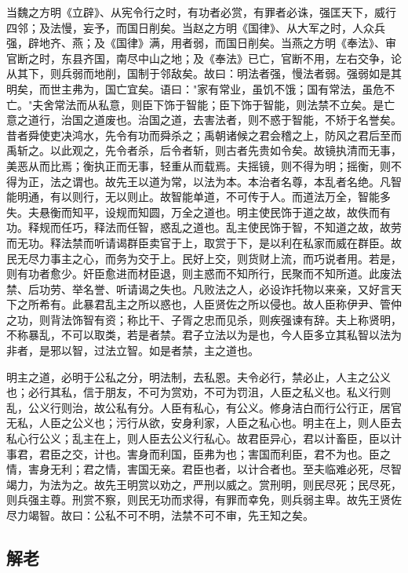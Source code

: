 \documentclass[]{article}
\begin{document}
当魏之方明《立辟》、从宪令行之时，有功者必赏，有罪者必诛，强匡天下，威行四邻；及法慢，妄予，而国日削矣。当赵之方明《国律》、从大军之时，人众兵强，辟地齐、燕；及《国律》满，用者弱，而国日削矣。当燕之方明《奉法》、审官断之时，东县齐国，南尽中山之地；及《奉法》已亡，官断不用，左右交争，论从其下，则兵弱而地削，国制于邻敌矣。故曰：明法者强，慢法者弱。强弱如是其明矣，而世主弗为，国亡宜矣。语曰："家有常业，虽饥不饿；国有常法，虽危不亡。"夫舍常法而从私意，则臣下饰于智能；臣下饰于智能，则法禁不立矣。是亡意之道行，治国之道废也。治国之道，去害法者，则不惑于智能，不矫于名誉矣。昔者舜使吏决鸿水，先令有功而舜杀之；禹朝诸候之君会稽之上，防风之君后至而禹斩之。以此观之，先令者杀，后令者斩，则古者先贵如令矣。故镜执清而无事，美恶从而比焉；衡执正而无事，轻重从而载焉。夫摇镜，则不得为明；摇衡，则不得为正，法之谓也。故先王以道为常，以法为本。本治者名尊，本乱者名绝。凡智能明通，有以则行，无以则止。故智能单道，不可传于人。而道法万全，智能多失。夫悬衡而知平，设规而知圆，万全之道也。明主使民饰于道之故，故佚而有功。释规而任巧，释法而任智，惑乱之道也。乱主使民饰于智，不知道之故，故劳而无功。释法禁而听请谒群臣卖官于上，取赏于下，是以利在私家而威在群臣。故民无尽力事主之心，而务为交于上。民好上交，则货财上流，而巧说者用。若是，则有功者愈少。奸臣愈进而材臣退，则主惑而不知所行，民聚而不知所道。此废法禁、后功劳、举名誉、听请谒之失也。凡败法之人，必设诈托物以来亲，又好言天下之所希有。此暴君乱主之所以惑也，人臣贤佐之所以侵也。故人臣称伊尹、管仲之功，则背法饰智有资；称比干、子胥之忠而见杀，则疾强谏有辞。夫上称贤明，不称暴乱，不可以取类，若是者禁。君子立法以为是也，今人臣多立其私智以法为非者，是邪以智，过法立智。如是者禁，主之道也。

明主之道，必明于公私之分，明法制，去私恩。夫令必行，禁必止，人主之公义也；必行其私，信于朋友，不可为赏劝，不可为罚沮，人臣之私义也。私义行则乱，公义行则治，故公私有分。人臣有私心，有公义。修身洁白而行公行正，居官无私，人臣之公义也；污行从欲，安身利家，人臣之私心也。明主在上，则人臣去私心行公义；乱主在上，则人臣去公义行私心。故君臣异心，君以计畜臣，臣以计事君，君臣之交，计也。害身而利国，臣弗为也；害国而利臣，君不为也。臣之情，害身无利；君之情，害国无亲。君臣也者，以计合者也。至夫临难必死，尽智竭力，为法为之。故先王明赏以劝之，严刑以威之。赏刑明，则民尽死；民尽死，则兵强主尊。刑赏不察，则民无功而求得，有罪而幸免，则兵弱主卑。故先王贤佐尽力竭智。故曰：公私不可不明，法禁不可不审，先王知之矣。

\hypertarget{header-n934}{%
\subsection{解老}\label{header-n934}}
\end{document}
